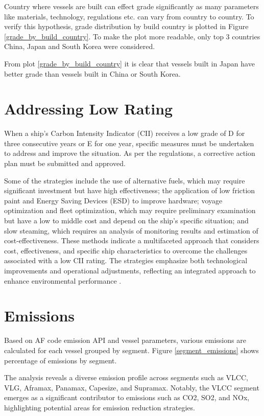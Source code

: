 Country where vessels are built can effect grade significantly as many parameters like materials, technology, regulations etc. can vary from country to country.
To verify this hypothesis, grade distribution by build country is plotted in Figure \ref{grade_by_build_country}.
To make the plot more readable, only top 3 countries China, Japan and South Korea were considered.

From plot \ref{grade_by_build_country} it is clear that vessels built in Japan have better grade than vessels built in China or South Korea.

\section{Addressing Low Rating}

When a ship's Carbon Intensity Indicator (CII) receives a low grade of D for three consecutive years or E for one year, specific measures must be undertaken to address and improve the situation. 
As per the regulations, a corrective action plan must be submitted and approved. 

Some of the strategies include the use of alternative fuels, which may require significant investment but have high effectiveness; 
the application of low friction paint and Energy Saving Devices (ESD) to improve hardware; 
voyage optimization and fleet optimization, which may require preliminary examination but have a low to middle cost and depend on the ship's specific situation; 
and slow steaming, which requires an analysis of monitoring results and estimation of cost-effectiveness. 
These methods indicate a multifaceted approach that considers cost, effectiveness, and specific ship characteristics to overcome the challenges associated with a low CII rating. 
The strategies emphasize both technological improvements and operational adjustments, reflecting an integrated approach to enhance environmental performance \autocite{Department_2023}.


\section{Emissions}

Based on AF code emission API and vessel parameters, various emissions are calculated for each vessel grouped by segment.
Figure \ref{segment_emissions} shows percentage of emissions by segment.

The analysis reveals a diverse emission profile across segments such as VLCC, VLG, Aframax, Panamax, Capesize, and Supramax. 
Notably, the VLCC segment emerges as a significant contributor to emissions such as CO2, SO2, and NOx, highlighting potential areas for emission reduction strategies.

